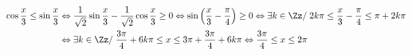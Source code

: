 {\begin{enumerate}
{\begin{align*}
\cos\frac{x}{3}\leq\sin\frac{x}{3}&\Leftrightarrow\frac{1}{\sqrt{2}}\sin\frac{x}{3}-\frac{1}{\sqrt{2}}\cos\frac{x}{3}\geq0
\Leftrightarrow\sin\left(\frac{x}{3}-\frac{\pi}{4}\right)\geq0\Leftrightarrow\exists k\in\Zz/\;2k\pi\leq\frac{x}{3}-\frac{\pi}{4}\leq\pi+2k\pi\\
 &\Leftrightarrow\exists k\in\Zz/\;\frac{3\pi}{4}+6k\pi\leq x\leq3\pi+\frac{3\pi}{4}+6k\pi\Leftrightarrow\frac{3\pi}{4}\leq x\leq2\pi
\end{align*}}
\end{enumerate}
}